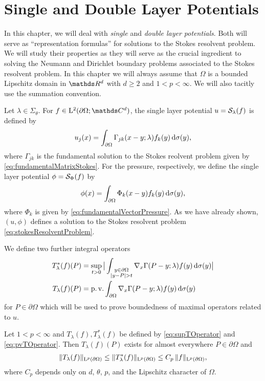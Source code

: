 \chapter{Single and Double Layer Potentials}
\label{chap:3}

In this chapter, we will deal with \emph{single} and \emph{double layer potentials}.
Both will serve as ``representation formulas'' for solutions to the Stokes resolvent problem.
We will study their properties as they will serve as the crucial ingredient to solving the Neumann and Dirichlet boundary problems associated to the Stokes resolvent problem.
In this chapter we will always assume that $\Omega$ is a bounded Lipschitz domain in $\R^d$ with $d \geq 2$ and $1 < p < \infty$.
We will also tacitly use the summation convention.

Let $\lambda \in \Sigma_\theta$. 
For $f \in \Ell^2(\partial\Omega; \C^d)$, the single layer potential $u = \mathcal{S}_\lambda(f)$ is defined by
\begin{align}
  \label{eq:defSingleLayer}
  u_j(x) 
  = \int_{\partial\Omega} \Gamma_{jk}(x - y; \lambda) f_k(y) \, {\operatorname{d}\!{\sigma}}(y),
\end{align}
where $\Gamma_{jk}$ is the fundamental solution to the Stokes reolvent problem given by \eqref{eq:fundamentalMatrixStokes}.
For the pressure, respectively, we define the single layer potential $\phi = \mathcal{S}_\Phi(f)$ by
\begin{align}
  \label{eq:defSingleLayerPressure}
  \phi(x) = \int_{\partial\Omega} \Phi_k(x - y) f_k(y) \, {\operatorname{d}\!{\sigma}}(y),
\end{align}
where $\Phi_k$ is given by \eqref{eq:fundamentalVectorPressure}.
As we have already shown, $(u,\phi)$ defines a solution to the Stokes resolvent problem \eqref{eq:stokesResolventProblem}.

We define two further integral operators
\begin{align}
  T_\lambda^*(f)(P) &= \sup_{t > 0} \big| \int_{\substack{y \in \partial\Omega \\ |y - P| > t}} \nabla_x \Gamma(P - y; \lambda) f(y) \, {\operatorname{d}\!{\sigma}}(y) \big| \label{eq:supTOperator}\\
  T_\lambda(f)(P) &= \operatorname{p. v.} \int_{\partial\Omega} \nabla_x \Gamma(P - y; \lambda) f(y) \, {\operatorname{d}\!{\sigma}}(y) \label{eq:pvTOperator}
\end{align}
for $P \in \partial\Omega$ which will be used to prove boundedness of maximal operators related to $u$.

\begin{lem}
  \label{lem:lpBoundednessT}
  Let $1 < p < \infty$ and $T_\lambda(f), T_\lambda^*(f)$ be defined by \eqref{eq:supTOperator} and \eqref{eq:pvTOperator}.
  Then $T_\lambda(f)(P)$ exists for almost everywhere $P \in \partial\Omega$ and
  \begin{align}
    \label{eq:lpBoundednessT}
    \|T_\lambda(f) \|_{\mathrm{L}^p(\partial\Omega)} 
    \leq \|T_\lambda^*(f) \|_{\mathrm{L}^p(\partial\Omega)}
    \leq C_p \, \|f\|_{\mathrm{L}^p(\partial\Omega)},
  \end{align}
  where $C_p$ depends only on $d$, $\theta$, $p$, and the Lipschitz character of $\Omega$.
\end{lem}

